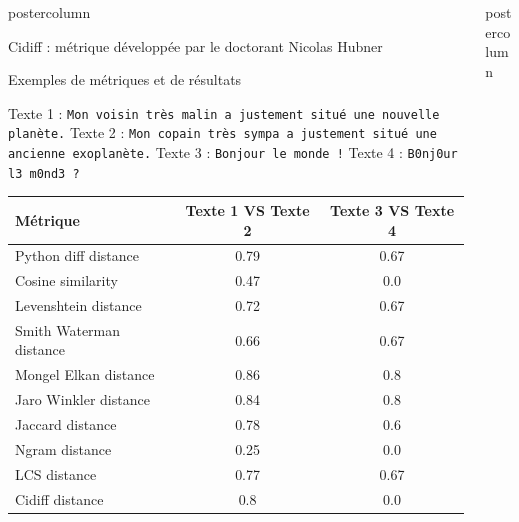 \begin{frame}
\begin{columns}
\begin{column}{.49\textwidth}
\begin{beamercolorbox}[center,wd=\textwidth]{postercolumn}
\begin{minipage}[T]{.95\textwidth}
{\begin{block}{Cidiff : métrique développée par le doctorant Nicolas Hubner}
            \end{block}
            
            \vfill
            
            \begin{block}{Exemples de métriques et de résultats}

              Texte 1 : \texttt{Mon voisin très malin a justement situé une nouvelle planète.}
              \newline
              Texte 2 : \texttt{Mon copain très sympa a justement situé une ancienne exoplanète.}
              \newline
              Texte 3 : \texttt{Bonjour le monde !}
              \newline
              Texte 4 : \texttt{B0nj0ur l3 m0nd3 ?}
            
              \begin{tabular}{|l|c|c|}
                \hline
                \textbf{Métrique} & \textbf{Texte 1 VS Texte 2} & \textbf{Texte 3 VS Texte 4} \\
                \hline
                Python diff distance & 0.79 & 0.67 \\
                Cosine similarity & 0.47 & 0.0 \\
                Levenshtein distance & 0.72 & 0.67 \\
                Smith Waterman distance & 0.66 & 0.67 \\
                Mongel Elkan distance & 0.86 & 0.8 \\
                Jaro Winkler distance & 0.84 & 0.8 \\
                Jaccard distance & 0.78 & 0.6 \\
                Ngram distance & 0.25 & 0.0 \\
                LCS distance & 0.77 & 0.67 \\
                Cidiff distance & 0.8 & 0.0 \\
                \hline
              \end{tabular}
            
            \end{block}
            \vfill
            
          }
        \end{minipage}
      \end{beamercolorbox}
    \end{column}
    \begin{column}{.49\textwidth}
      \begin{beamercolorbox}[center,wd=\textwidth]{postercolumn}
        \begin{minipage}[T]{.95\textwidth}
          \parbox[t][\columnheight]{\textwidth}{
            
}
\end{minipage}
\end{beamercolorbox}
\end{column}
\end{columns}
\end{frame}

